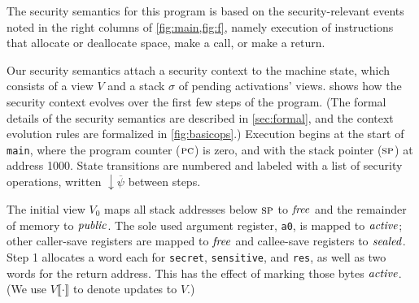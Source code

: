 \documentclass[10pt,conference]{ieeetran}%
\theoremstyle{definition}
\begin{document}
The security semantics for this program is based
on the security-relevant events noted in the right columns of \cref{fig:main,fig:f},
namely execution of instructions that allocate or deallocate space,
make a call, or make a return.

Our security semantics attach a security context to the machine state,
which consists of a view \(V\) and a stack \(\sigma\) of pending activations' views.
 shows how the security context evolves over the first few
steps of the program.  (The formal details of the security semantics are described in
\cref{sec:formal}, and the context evolution rules are formalized in \cref{fig:basicops}.)
Execution begins at the start of {\tt main}, where the program counter (\(\textsc{pc}\)) is zero,
and with the stack pointer (\(\textsc{sp}\)) at address 1000.
State transitions are numbered and labeled with a list of security operations, written
\(\downarrow \overline{\psi}\) between steps.

The initial view \(V_0\) maps all stack addresses below \(\textsc{sp}\) to \(\mathit{free}\) and the remainder of
memory to \(\mathit{public}\). The sole used argument register, {\tt a0}, is mapped to \(\mathit{active}\);
other caller-save registers are mapped to \(\mathit{free}\) and callee-save registers to \(\mathit{sealed}\).
Step 1 allocates a word each for {\tt secret}, {\tt sensitive}, and {\tt res}, as well
as two words for the return address. This has the
effect of marking those bytes \(\mathit{active}\).
(We use \(V\llbracket\cdot\rrbracket\) to denote updates to \(V\).)
\end{document}
